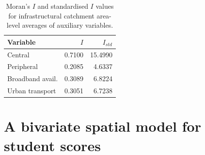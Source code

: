 \documentclass[openany, 11pt, oneside]{book}
\begin{document}


\begin{table}[ht]
\centering
\begin{tabular}{lrr}
Variable & $I$ & $I_{std}$             \\ \hline
Central & 0.7100 & 15.4990             \\
Peripheral & 0.2085  & 4.6337         \\ %
Broadband avail. & 0.3089  & 6.8224  \\
Urban transport &  0.3051 & 6.7238    \\
\hline
\end{tabular}
  \captionsetup{width=0.9\textwidth}
\caption{Moran's $I$ and standardised $I$ values for infrastructural catchment area-level averages of auxiliary variables.}
\label{tab:MoranPole}
\end{table}

\section{A bivariate spatial model for student scores} \label{section:Model_outline}
\end{document}

